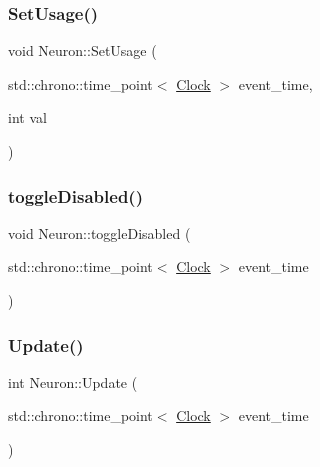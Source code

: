 \mbox{\label{classNeuron_abf99856ac41b5c9c4948b3204bbc1590}} 
\subsubsection{\texorpdfstring{Set\+Usage()}{SetUsage()}}
{\footnotesize\ttfamily void Neuron\+::\+Set\+Usage (\begin{DoxyParamCaption}\item[{std\+::chrono\+::time\+\_\+point$<$ \mbox{\hyperlink{universe_8h_a0ef8d951d1ca5ab3cfaf7ab4c7a6fd80}{Clock}} $>$}]{event\+\_\+time,  }\item[{int}]{val }\end{DoxyParamCaption})\hspace{0.3cm}{\ttfamily [inline]}}

\mbox{\label{classNeuron_a32fe82aa21f8a68392d696eea3a34c99}} 
\subsubsection{\texorpdfstring{toggle\+Disabled()}{toggleDisabled()}}
{\footnotesize\ttfamily void Neuron\+::toggle\+Disabled (\begin{DoxyParamCaption}\item[{std\+::chrono\+::time\+\_\+point$<$ \mbox{\hyperlink{universe_8h_a0ef8d951d1ca5ab3cfaf7ab4c7a6fd80}{Clock}} $>$}]{event\+\_\+time }\end{DoxyParamCaption})\hspace{0.3cm}{\ttfamily [inline]}}

\mbox{\label{classNeuron_a4d1dc3a9f30196fe2b09dfbfc0a567bb}} 
\subsubsection{\texorpdfstring{Update()}{Update()}}
{\footnotesize\ttfamily int Neuron\+::\+Update (\begin{DoxyParamCaption}\item[{std\+::chrono\+::time\+\_\+point$<$ \mbox{\hyperlink{universe_8h_a0ef8d951d1ca5ab3cfaf7ab4c7a6fd80}{Clock}} $>$}]{event\+\_\+time }\end{DoxyParamCaption})}

